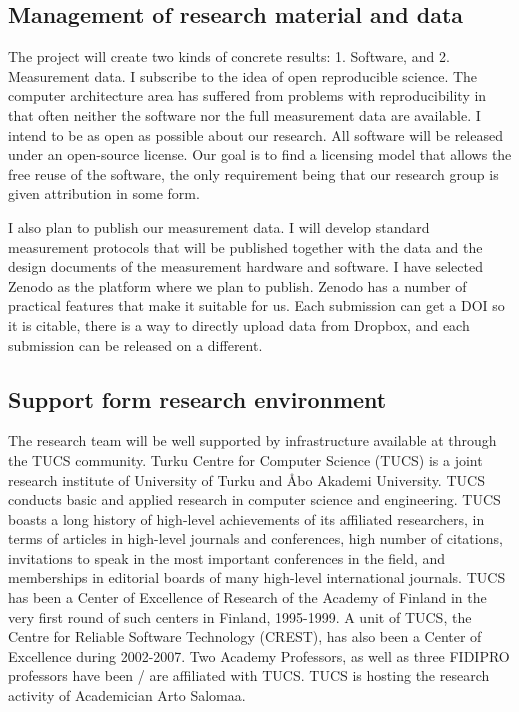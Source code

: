 \documentclass{article}
\begin{document}
\subsection{Management of research material and data}
The project will create two kinds of concrete results: 1. Software, and 2. Measurement data. I subscribe to the idea of open reproducible science. 
The computer architecture area has suffered from problems with reproducibility in that often neither the software nor the full measurement data are available. 
I intend to be as open as possible about our research. All software will be released under an open-source license. 
Our goal is to find a licensing model that allows the free reuse of the software, the only requirement being that our research group is given attribution in some form. 

I also plan to publish our measurement data. 
I will develop standard measurement protocols that will be published together with the data and the design documents of the measurement hardware and software. 
I have selected Zenodo as the platform where we plan to publish. Zenodo has a number of practical features that make it suitable for us. 
Each submission can get a DOI so it is citable, there is a way to directly upload data from Dropbox, and each submission can be released on a different.

\subsection{Support form research environment}
The research team will be well supported by infrastructure available at through the TUCS community. 
Turku Centre for Computer Science (TUCS) is a joint research institute of University of Turku and \AA{}bo Akademi University. 
TUCS conducts basic and applied research in computer science and engineering. 
TUCS boasts a long history of high-level achievements of its affiliated researchers, in terms of articles in high-level journals and conferences, high number of citations, 
invitations to speak in the most important conferences in the field, and memberships in editorial boards of many high-level international journals. 
TUCS has been a Center of Excellence of Research of the Academy of Finland in the very first round of such centers in Finland, 1995-1999. 
A unit of TUCS, the Centre for Reliable Software Technology (CREST), has also been a Center of Excellence during 2002-2007. 
Two Academy Professors, as well as three FIDIPRO professors have been / are affiliated with TUCS. 
TUCS is hosting the research activity of Academician Arto Salomaa.
\end{document}
